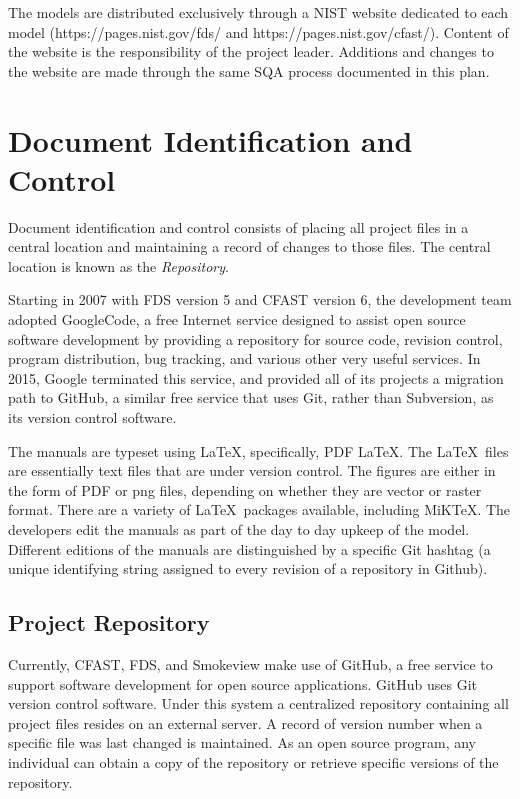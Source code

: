 \documentclass[11pt]{book}
\begin{document}
The models are distributed exclusively through a NIST website dedicated to each model (https://pages.nist.gov/fds/ and https://pages.nist.gov/cfast/).  Content of the website is the responsibility of the project leader. Additions and changes to the website are made through the same SQA process documented in this plan.


\section{Document Identification and Control}

Document identification and control consists of placing all project files in a central location and maintaining a record of changes to those files. The central location is known as the {\em Repository}.

Starting in 2007 with FDS version 5 and CFAST version 6, the development team adopted GoogleCode, a free Internet service designed to assist open source software development by providing a repository for source code, revision control, program distribution, bug tracking, and various other very useful services. In 2015, Google terminated this service, and provided all of its projects a migration path to GitHub, a similar free service that uses Git, rather than Subversion, as its version control software.

The manuals are typeset using \LaTeX, specifically, PDF \LaTeX. The \LaTeX\ files are essentially text files that are under version control. The figures are either in the form of PDF or png files, depending on whether they are vector or raster format. There are a variety of \LaTeX\ packages available, including MiKTeX. The developers edit the manuals as part of the day to day upkeep of the model. Different editions of the manuals are distinguished by a specific Git hashtag (a unique identifying string assigned to every revision of a repository in Github).


\subsection{Project Repository}

Currently, CFAST, FDS, and Smokeview make use of GitHub, a free service to support software development for open source applications. GitHub uses Git version control software. Under this system a centralized repository containing all project files resides on an external server.   A record of version number when a specific file was last changed is maintained. As an open source program, any individual can obtain a copy of the repository or retrieve specific versions of the repository.
\end{document}
